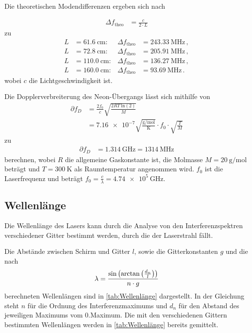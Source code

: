 Die theoretischen Modendifferenzen ergeben sich nach

\begin{align*}
  \Delta f_{\text{theo}} &= \frac{c}{2 \cdot L}
\end{align*}
zu 
\begin{align*}
  L &= \SI{ 61.6}{\centi\meter}: & \Delta f_\text{theo} &= \SI{243.33}{\mega\hertz}\, , \\  
  L &= \SI{ 72.8}{\centi\meter}: & \Delta f_\text{theo} &= \SI{205.91}{\mega\hertz}\, , \\  
  L &= \SI{110.0}{\centi\meter}: & \Delta f_\text{theo} &= \SI{136.27}{\mega\hertz}\, , \\
  L &= \SI{160.0}{\centi\meter}: & \Delta f_\text{theo} &= \SI{93.69}{\mega\hertz}\, . 
\end{align*}
wobei $c$ die Lichtgeschwindigkeit ist.

Die Dopplerverbreiterung des Neon-Übergangs lässt sich mithilfe von 
\begin{align*}
  \partial f_D &= \frac{2f_0}{c} \sqrt{\frac{2RT\: \text{ln}(2)}{M}} \\
  &= \num{7.16e-7}\sqrt{\frac{\si{\gram\per\mol}}{\si{\kelvin}}} \cdot f_0 \cdot \sqrt{\frac{T}{M}}
\end{align*}
zu 
\begin{align*}
  \partial f_D &= \SI{1.314}{\giga\hertz} = \SI{1314}{\mega\hertz}
\end{align*}
berechnen, wobei $R$ die allgemeine Gaskonstante ist, die Molmasse
$M = \SI{20}{\gram\per\mol}$ beträgt und $T=\qty{300}{\kelvin}$ als Raumtemperatur angenommen wird.
$f_0$ ist die Laserfrequenz und beträgt $f_0= \frac{c}{\lambda} = \SI{4.74e5}{\giga\hertz}$.


\subsection{Wellenlänge}
\label{sub:Wellenlänge}

Die Wellenlänge des Lasers kann durch die Analyse von den Interferenzspektren verschiedener Gitter bestimmt werden, durch die der Laserstrahl fällt.

Die Abstände zwischen Schirm und Gitter $l$, sowie die Gitterkonstanten $g$ und die nach
\begin{equation*}
  \lambda = \frac{\text{sin}\left(\text{arctan}\left(\frac{d_n}{l}\right)\right)}{n \cdot g}\\
  \label{eqn:Wellenlänge}
\end{equation*}
berechneten Wellenlängen sind in \autoref{tab:Wellenlänge} dargestellt. In der Gleichung steht $n$ für die Ordnung des Interferenzmaximums und
$d_n$ für den Abstand des jeweiligen Maximums vom 0.Maximum.
Die mit den verschiedenen Gittern bestimmten Wellenlängen werden in \autoref{tab:Wellenlänge} bereits gemittelt.


